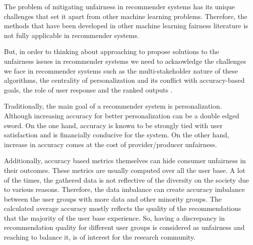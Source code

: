 The problem of mitigating unfairness in recommender systems has its unique challenges that set it apart from other machine learning problems. Therefore, the methods that have been developed in other machine learning fairness literature is not fully applicable in recommender systems.

But, in order to thinking about approaching to propose solutions to the unfairness issues in recommender systems we need to acknowledge the challenges we face in recommender systems such as the multi-stakeholder nature of these algorithms, the centrality of personalization and its conflict with accuracy-based goals, the role of user response  and the ranked outputs . 


Traditionally, the main goal of a recommender system is personalization. Although increasing accuracy for better personalization can be a double edged sword. On the one hand, accuracy is known to be strongly tied with user satisfaction and is financially conducive for the system. On the other hand, increase in accuracy comes at the cost of provider/producer unfairness. 

Additionally, accuracy based metrics themselves can hide consumer unfairness in their outcomes.
These metrics are usually computed over all the user base. A lot of the times, the gathered data is not reflective of the diversity on the society due to various reasons. Therefore, the data imbalance can create accuracy imbalance between the user groups with more data and other minority groups. The calculated average accuracy mostly reflects the quality of the recommendations that the majority of the user base experience. So, having a discrepancy in recommendation quality for different user groups is considered as unfairness and reaching to balance it, is of interest for the research community.




